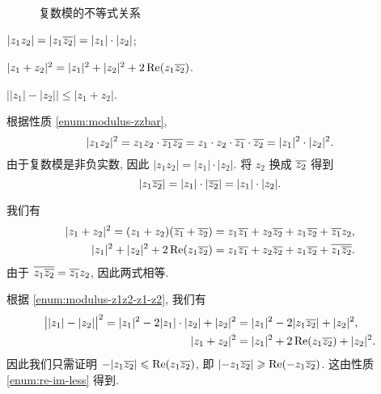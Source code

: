 \begin{figure}[!htb]
  \caption{复数模的不等式关系}
  \label{fig:inequality_of_modulus}
\end{figure}

\begin{exampleenum}[证明:]
  \item $|z_1z_2|=|z_1\overline{z_2}|=|z_1|\cdot|z_2|$;
  \label{enum:modulus-z1z2-z1-z2}
  \item $|z_1+z_2|^2=|z_1|^2+|z_2|^2+2\operatorname{Re}(z_1\overline{z_2})$.
  \item $\bigl||z_1|-|z_2|\bigr|\le|z_1+z_2|$.
\end{exampleenum}

\begin{proofenumr}
  \item 根据性质 \ref{enum:modulus-zzbar},
  \[
      |z_1z_2|^2=z_1z_2\cdot\overline{z_1}\overline{z_2}
    =z_1\cdot z_2\cdot \overline{z_1}\cdot \overline{z_2}
    =|z_1|^2\cdot|z_2|^2.
  \]
  由于复数模是非负实数, 因此 $|z_1z_2|=|z_1|\cdot|z_2|$.
  将 $z_2$ 换成 $\overline{z_2}$ 得到
  \[
      |z_1\overline{z_2}|
    =|z_1|\cdot|\overline{z_2}|
    =|z_1|\cdot|z_2|.
  \]
  \item 我们有
  \begin{align*}
      |z_1+z_2|^2
    =(z_1+z_2)(\overline{z_1}+\overline{z_2})&
    =z_1\overline{z_1}+z_2\overline{z_2}+z_1\overline{z_2}+\overline{z_1}z_2,\\
      |z_1|^2+|z_2|^2+2\operatorname{Re}(z_1\overline{z_2})&
    =z_1\overline{z_1}+z_2\overline{z_2}+z_1\overline{z_2}+\overline{z_1\overline{z_2}}.
  \end{align*}
  由于 $\overline{z_1\overline{z_2}}=\overline{z_1}z_2$, 因此两式相等.
  \item 根据 \ref{enum:modulus-z1z2-z1-z2}, 我们有
  \begin{align*}
      \bigl||z_1|-|z_2|\bigr|^2
    =|z_1|^2-2|z_1|\cdot|z_2|+|z_2|^2&
    =|z_1|^2-2|z_1 \overline{z_2}|+|z_2|^2,\\
      |z_1+z_2|^2&
    =|z_1|^2+2\operatorname{Re}(z_1 \overline{z_2})+|z_2|^2.
  \end{align*}
  因此我们只需证明 $-|z_1 \overline{z_2}|\leqslant \operatorname{Re}(z_1 \overline{z_2})$, 即 $|{-z_1 \overline{z_2}}|\geqslant \operatorname{Re}(-z_1 \overline{z_2})$.
  这由性质 \ref{enum:re-im-less} 得到.
  \qedhere
\end{proofenumr}

